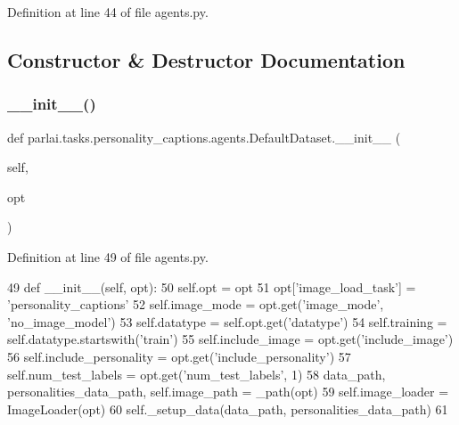 Definition at line 44 of file agents.\+py.



\subsection{Constructor \& Destructor Documentation}
\mbox{\label{classparlai_1_1tasks_1_1personality__captions_1_1agents_1_1DefaultDataset_ad6cd645c8b905614663c2b6a0595fb68}} 
\subsubsection{\texorpdfstring{\+\_\+\+\_\+init\+\_\+\+\_\+()}{\_\_init\_\_()}}
{\footnotesize\ttfamily def parlai.\+tasks.\+personality\+\_\+captions.\+agents.\+Default\+Dataset.\+\_\+\+\_\+init\+\_\+\+\_\+ (\begin{DoxyParamCaption}\item[{}]{self,  }\item[{}]{opt }\end{DoxyParamCaption})}



Definition at line 49 of file agents.\+py.


\begin{DoxyCode}
49     \textcolor{keyword}{def }\_\_init\_\_(self, opt):
50         self.opt = opt
51         opt[\textcolor{stringliteral}{'image\_load\_task'}] = \textcolor{stringliteral}{'personality\_captions'}
52         self.image\_mode = opt.get(\textcolor{stringliteral}{'image\_mode'}, \textcolor{stringliteral}{'no\_image\_model'})
53         self.datatype = self.opt.get(\textcolor{stringliteral}{'datatype'})
54         self.training = self.datatype.startswith(\textcolor{stringliteral}{'train'})
55         self.include\_image = opt.get(\textcolor{stringliteral}{'include\_image'})
56         self.include\_personality = opt.get(\textcolor{stringliteral}{'include\_personality'})
57         self.num\_test\_labels = opt.get(\textcolor{stringliteral}{'num\_test\_labels'}, 1)
58         data\_path, personalities\_data\_path, self.image\_path = \_path(opt)
59         self.image\_loader = ImageLoader(opt)
60         self.\_setup\_data(data\_path, personalities\_data\_path)
61 
\end{DoxyCode}


